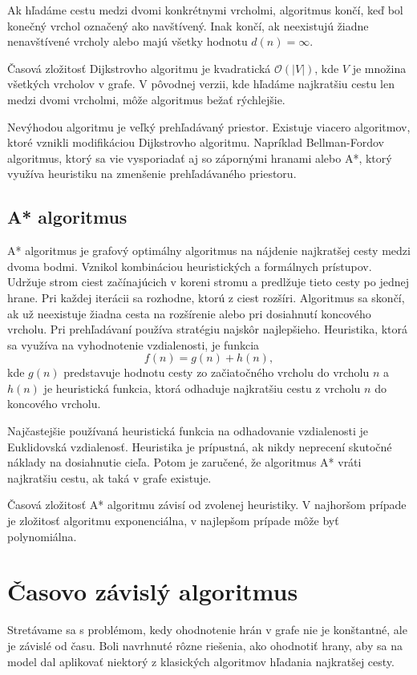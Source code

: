 Ak hľadáme cestu medzi dvomi konkrétnymi vrcholmi, algoritmus končí, keď bol konečný vrchol označený ako navštívený. Inak končí, ak neexistujú žiadne nenavštívené vrcholy alebo majú všetky hodnotu $d(n) = \infty$.

Časová zložitosť Dijkstrovho algoritmu je kvadratická
$\mathcal{O}(|V|)$, kde $V$ je množina všetkých vrcholov v grafe. V pôvodnej verzii, kde hľadáme najkratšiu cestu len medzi dvomi vrcholmi, môže algoritmus bežať rýchlejšie.

Nevýhodou algoritmu je veľký prehľadávaný priestor. Existuje viacero algoritmov, ktoré vznikli modifikáciou Dijkstrovho algoritmu. Napríklad Bellman-Fordov algoritmus, ktorý sa vie vysporiadať aj so zápornými hranami alebo A*, ktorý využíva heuristiku na zmenšenie prehľadávaného priestoru. 

\subsection{A* algoritmus}
\label{sec:a-star}
A* algoritmus je grafový optimálny algoritmus na nájdenie najkratšej cesty medzi dvoma bodmi. Vznikol kombináciou heuristických a formálnych prístupov. Udržuje strom ciest začínajúcich v koreni stromu a predlžuje tieto cesty po jednej hrane. Pri každej iterácii sa rozhodne, ktorú z ciest rozšíri. Algoritmus sa skončí, ak už neexistuje žiadna cesta na rozšírenie alebo pri dosiahnutí koncového vrcholu. Pri prehľadávaní používa stratégiu najskôr najlepšieho. Heuristika, ktorá sa využíva na vyhodnotenie vzdialenosti, je funkcia
\begin{equation}
f(n) = g(n) + h(n), 
\end{equation}
kde $g(n)$ predstavuje hodnotu cesty zo začiatočného vrcholu do vrcholu $n$ a $h(n)$ je heuristická funkcia, ktorá odhaduje najkratšiu cestu z vrcholu $n$ do koncového vrcholu.

Najčastejšie používaná heuristická funkcia na odhadovanie vzdialenosti je Euklidovská vzdialenosť.
Heuristika je prípustná, ak nikdy neprecení skutočné náklady na dosiahnutie cieľa. Potom je zaručené, že algoritmus A* vráti najkratšiu cestu, ak taká v grafe existuje.

Časová zložitosť A* algoritmu závisí od zvolenej heuristiky. V najhoršom prípade je zložitosť algoritmu exponenciálna, v najlepšom prípade môže byť polynomiálna.

\section{Časovo závislý algoritmus}
\label{sec:time-dependant-algorithm}
Stretávame sa s problémom, kedy ohodnotenie hrán v grafe nie je konštantné, ale je závislé od času. Boli navrhnuté rôzne riešenia, ako ohodnotiť hrany, aby sa na model dal aplikovať niektorý z klasických algoritmov hľadania najkratšej cesty. 


